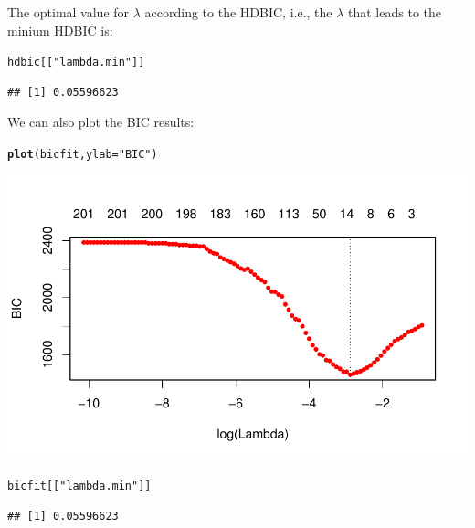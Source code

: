 \documentclass[12pt,letter]{article}\usepackage[]{graphicx}\usepackage[]{color}
\makeatletter
\newcommand{\hlstr}[1]{\textcolor[rgb]{0.192,0.494,0.8}{#1}}%
\newcommand{\hlstd}[1]{\textcolor[rgb]{0.345,0.345,0.345}{#1}}%
\newcommand{\hlkwc}[1]{\textcolor[rgb]{0.333,0.667,0.333}{#1}}%
\newcommand{\hlkwd}[1]{\textcolor[rgb]{0.737,0.353,0.396}{\textbf{#1}}}%
\newenvironment{kframe}{%
 \def\at@end@of@kframe{}%
 \ifinner\ifhmode%
  \def\at@end@of@kframe{\end{minipage}}%
  \begin{minipage}{\columnwidth}%
 \fi\fi%
 \def\FrameCommand##1{\hskip\@totalleftmargin \hskip-\fboxsep
 \colorbox{shadecolor}{##1}\hskip-\fboxsep
     \hskip-\linewidth \hskip-\@totalleftmargin \hskip\columnwidth}%
 \MakeFramed {\advance\hsize-\width
   \@totalleftmargin\z@ \linewidth\hsize
   \@setminipage}}%
 {\par\unskip\endMakeFramed%
 \at@end@of@kframe}
\newenvironment{knitrout}{}{} %
\makeatother
\begin{document}
The optimal value for $\lambda$ according to the HDBIC, i.e., the $\lambda$ that leads to the minium HDBIC is:

\begin{knitrout}\scriptsize
{}\color{fgcolor}\begin{kframe}
\begin{alltt}
\hlstd{hdbic[[}\hlstr{"lambda.min"}\hlstd{]]}
\end{alltt}
\begin{verbatim}
## [1] 0.05596623
\end{verbatim}
\end{kframe}
\end{knitrout}


We can also plot the BIC results:

\begin{knitrout}\scriptsize
{}\color{fgcolor}\begin{kframe}
\begin{alltt}
\hlkwd{plot}\hlstd{(bicfit,} \hlkwc{ylab} \hlstd{=} \hlstr{"BIC"}\hlstd{)}
\end{alltt}
\end{kframe}

{\centering \includegraphics[width=1\linewidth]{figure/ggmix-bic-1} 

}


\begin{kframe}\begin{alltt}
\hlstd{bicfit[[}\hlstr{"lambda.min"}\hlstd{]]}
\end{alltt}
\begin{verbatim}
## [1] 0.05596623
\end{verbatim}
\end{kframe}
\end{knitrout}
\end{document}
